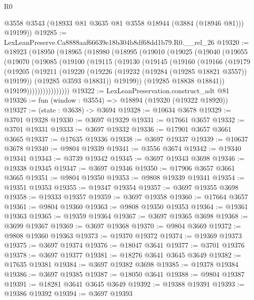 \begin{lexlean}{R0}
\begin{coremodule}
        @3558
        @3543
        (@18933 @81 @3635 @81 @3558 @18944 (@3884 (@18946 @81)))
        @19199))
@19285 := LexLeanPreserve.Ca8888aaf66639e18b304b8df68dd1b79.R0.__rel_26
@19320 := @18923
    (@18950
      (@18965
        (@18980
          (@18995
            (@19010
              (@19025
                (@19040
                  (@19055
                    (@19070
                      (@19085
                        (@19100
                          (@19115
                            (@19130
                              (@19145
                                (@19160
                                  (@19166
                                    (@19179
                                      (@19205
                                        (@19211
                                          (@19220
                                            (@19226 (@19232 (@19284 (@19285 @18821 @3557)) @19199))
                                            (@19285 @3593 @18831))
                                          @19199))
                                      (@19285 @18838 @18841))
                                    @19199))))))))))))))))
@19322 := LexLeanPreservation.construct_adt @81
@19326 := fun (window : @3554) => @18894 (@19320 (@19322 @18920))
@19327 := (state : @3638) -> @3694
@19328 := @10634 @3678
@19329 := @3701 @19328
@19330 := @3697 @19329
@19331 := @17661 @3657
@19332 := @3701 @19331
@19333 := @3697 @19332
@19336 := @17901 @3657 @3661 @3665
@19337 := @17635 @19336
@19338 := @3697 @19337
@19339 := @10637 @3678
@19340 := @9804 @19339
@19341 := @3556 @3674
@19342 := @19340 @19341
@19343 := @3739 @19342
@19345 := @3697 @19343 @3698
@19346 := @19338 @19345
@19347 := @3697 @19346
@19350 := @17906 @3657 @3661 @3665
@19351 := @9804 @19350
@19353 := @9808 @19339 @19341
@19354 := @19351 @19353
@19355 := @19347 @19354
@19357 := @3697 @19355 @3698
@19358 := @19333 @19357
@19359 := @3697 @19358
@19360 := @17664 @3657
@19361 := @9804 @19360
@19363 := @9808 @19350 @19353
@19364 := @19361 @19363
@19365 := @19359 @19364
@19367 := @3697 @19365 @3698
@19368 := @3699 @19367
@19369 := @3697 @19368
@19370 := @9804 @3669
@19372 := @9808 @19360 @19363
@19373 := @19370 @19372
@19374 := @19369 @19373
@19375 := @3697 @19374
@19376 := @18047 @3641
@19377 := @3701 @19376
@19378 := @3697 @19377
@19381 := @18276 @3641 @3645 @3649
@19382 := @17635 @19381
@19384 := @3697 @19382 @3698
@19385 := @19378 @19384
@19386 := @3697 @19385
@19387 := @18050 @3641
@19388 := @9804 @19387
@19391 := @18281 @3641 @3645 @3649
@19392 := @19388 @19391
@19393 := @19386 @19392
@19394 := @3697 @19393

\end{coremodule}
\end{lexlean}
